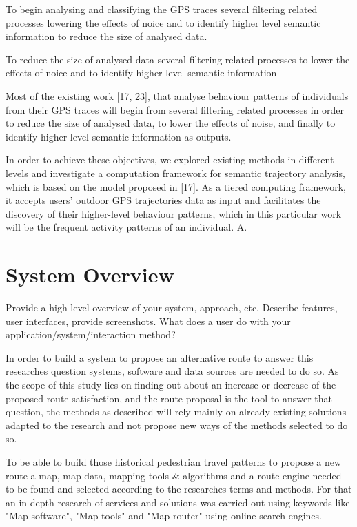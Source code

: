To begin analysing and classifying the GPS traces several filtering related processes lowering the effects of noice and to identify higher level semantic information to reduce the size of analysed data. 

To reduce the size of analysed data several filtering related processes to lower the effects of noice and to identify higher level semantic information 


Most of the existing work [17, 23], that analyse behaviour
patterns of individuals from their GPS traces will begin from several filtering related processes in order to reduce the size of analysed data, to lower the effects of noise, and finally to identify higher level semantic information as outputs. 


In order to achieve these objectives, we explored existing methods in different levels and investigate a computation framework for semantic trajectory analysis, which is based on the model proposed in [17]. As a tiered computing framework, it accepts users’ outdoor GPS trajectories data as input and facilitates the discovery of their higher-level behaviour patterns, which in this particular work will be the frequent activity patterns of an individual.
A.



\section{System Overview}

Provide a high level overview of your system, approach, etc. 
Describe features, user interfaces, provide screenshots.
What does a user do with your application/system/interaction method?

In order to build a system to propose an alternative route to answer this researches question systems, software and data sources are needed to do so. As the scope of this study lies on finding out about an increase or decrease of the proposed route satisfaction, and the route proposal is the tool to answer that question, the methods as described will rely mainly on already existing solutions adapted to the research and not propose new ways of the methods selected to do so. 

To be able to build those historical pedestrian travel patterns to propose a new route a map, map data, mapping tools & algorithms and a route engine needed to be found and selected according to the researches terms and methods. For that an in depth research of services and solutions was carried out using keywords like "Map software", "Map tools" and "Map router" using online search engines.

